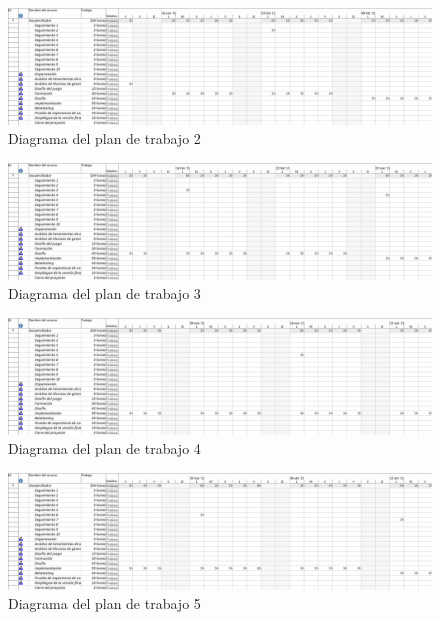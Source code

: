 			\begin{figure}[!htp]
				\centering
				\includegraphics[page=2, scale=.5, angle=90]{fig/Plan2}
				\caption{Diagrama del plan de trabajo 2}
			\end{figure}

			\begin{figure}[!htp]
				\centering
				\includegraphics[page=3, scale=.5, angle=90]{fig/Plan3}
				\caption{Diagrama del plan de trabajo 3}
			\end{figure}

			\begin{figure}[!htp]
				\centering
				\includegraphics[page=4, scale=.5, angle=90]{fig/Plan4}
				\caption{Diagrama del plan de trabajo 4}
			\end{figure}

			\begin{figure}[!htp]
				\centering
				\includegraphics[page=5, scale=.5, angle=90]{fig/Plan5}
				\caption{Diagrama del plan de trabajo 5}
			\end{figure}

